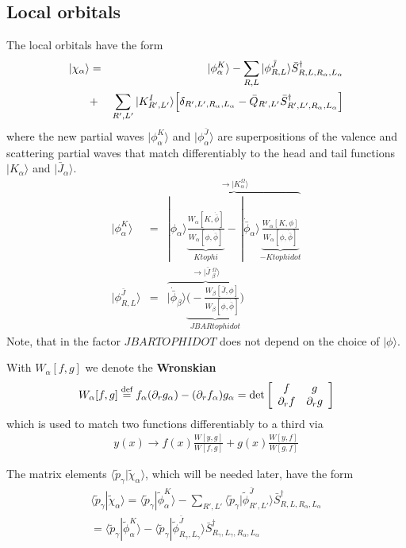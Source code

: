 \documentclass[11pt,a4paper]{report}
\begin{document}
\subsection{Local orbitals}
The local orbitals have the form
\begin{eqnarray}
|\chi_\alpha\rangle&=&|\phi^K_\alpha\rangle
- \sum_{R,L}|\phi^{\bar{J}}_{R,L}\rangle \bar{S}^\dagger_{R,L,R_\alpha,L_\alpha}
\nonumber\\
&+&\sum_{R',L'}|K^I_{R',L'}\rangle\Bigl[ \delta_{R',L',R_\alpha,L_\alpha}-\bar{Q}_{R',L'}
\bar{S}^\dagger_{R',L',R_\alpha,L_\alpha}\Bigr]
\end{eqnarray}
where the new partial waves $|\phi^K_\alpha\rangle$ and
$|\phi^{\bar{J}}_\alpha\rangle$ are superpositions of the valence and
scattering partial waves that match differentiably to the head and
tail functions $|K_\alpha\rangle$ and $|\bar{J}_\alpha\rangle$.
\begin{eqnarray}
|\phi^K_\alpha\rangle&=&
\overbrace{
|\phi_\alpha\rangle 
\underbrace{
\frac{W_\alpha[K,\dot{\bar{\phi}}]}{W_\alpha[\phi,\dot{\bar{\phi}}]}}_{Ktophi}
-\,|\dot{\bar{\phi}}_\alpha\rangle 
\underbrace{\frac{W_\alpha[K,\phi]}{W_\alpha[\phi,\dot{\bar{\phi}}]}}_{-Ktophidot}
}^{\rightarrow |K^\Omega_\alpha\rangle}
\nonumber\\
|\phi^{\bar{J}}_{R,L}\rangle
&=&\overbrace{
|\dot{\bar{\phi}}_\beta\rangle 
\underbrace{\biggl(-\frac{W_\beta[\bar{J},\phi]}{W_\beta[\phi,\dot{\bar{\phi}}]}\biggr)}_{JBARtophidot}
}^{\rightarrow |\bar{J}\;^\Omega_\beta\rangle}
\end{eqnarray}
Note, that in the factor $JBARTOPHIDOT$ does not depend on the choice
of $|\phi\rangle$.

With $W_\alpha[f,g]$ we denote the \textbf{Wronskian}
\begin{eqnarray}
W_\alpha[f,g]\stackrel{\text{def}}{=} f_\alpha (\partial_r g_\alpha)-(\partial_r f_\alpha)g_\alpha
=\det\left[\begin{array}{cc}f&g\\\partial_rf&\partial_rg\end{array}\right]
\end{eqnarray}
which is used to match two functions differentiably to a third via
\begin{eqnarray}
y(x)\rightarrow f(x)\frac{W[y,g]}{W[f,g]}+g(x)\frac{W[y,f]}{W[g,f]}
\end{eqnarray}


The matrix elements
$\langle\tilde{p}_\gamma|\tilde{\chi}_\alpha\rangle$, which will be
needed later, have the form
\begin{eqnarray}
\langle\tilde{p}_\gamma|\tilde{\chi}_\alpha\rangle
=\langle\tilde{p}_\gamma|\tilde{\phi}^K_\alpha\rangle
-\sum_{R',L'}\langle\tilde{p}_\gamma|\tilde{\phi}^{\bar{J}}_{R',L'}\rangle
\bar{S}^\dagger_{R,L,R_\alpha,L_\alpha}
\nonumber\\
=\langle\tilde{p}_\gamma|\tilde{\phi}^K_\alpha\rangle
-\langle\tilde{p}_\gamma|\tilde{\phi}^{\bar{J}}_{R_\gamma,L_\gamma}\rangle
\bar{S}^\dagger_{R_\gamma,L_\gamma,R_\alpha,L_\alpha}
\end{eqnarray}
\end{document}

